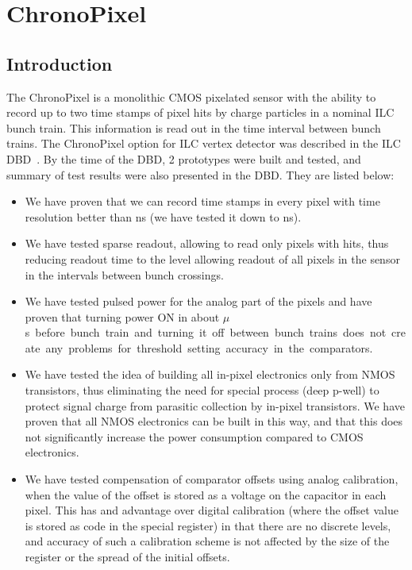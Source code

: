 \section{ChronoPixel}

\subsection{Introduction}
The ChronoPixel is a monolithic CMOS pixelated sensor with the ability to record up to two time stamps of pixel hits by charge particles in a nominal ILC bunch train. This information is read out in the time interval between bunch trains. The ChronoPixel option for ILC vertex detector was described in the ILC DBD~\cite{2011arXiv1109.2811B}. By the time of the DBD, 2 prototypes were built and tested, and summary of test results were also presented in the DBD. They are listed below: 
\begin{itemize}
    \item We have proven  that we can record time stamps in every pixel with time resolution better than \unit[300]{ns} (we have tested it down to \unit[150]{ns}).
    \item We have tested sparse readout, allowing to read only pixels with hits, thus reducing readout time to the level allowing readout of all pixels in the sensor in the intervals between bunch crossings.
    \item We have tested pulsed power for the analog part of the pixels and have proven  that turning power ON in about \unit[100]{$\mu$s} before bunch train and turning it off between bunch trains does not create any problems for threshold setting accuracy in the comparators.
    \item We have tested the idea of building all in-pixel electronics only from NMOS transistors, thus eliminating the need for special process (deep p-well) to protect signal charge from parasitic collection by in-pixel transistors. We have proven  that all NMOS electronics can be built in this way, and that this does not significantly increase the power consumption compared to CMOS electronics.
    \item We have tested compensation of comparator offsets using analog calibration, when the value of the offset is stored as a voltage on the capacitor in each pixel. This has and advantage over digital calibration (where the offset value is stored as code in the special register) in that there are no discrete levels, and accuracy of such a calibration scheme is not affected by the size of the register or the spread of the initial offsets.
\end{itemize}
